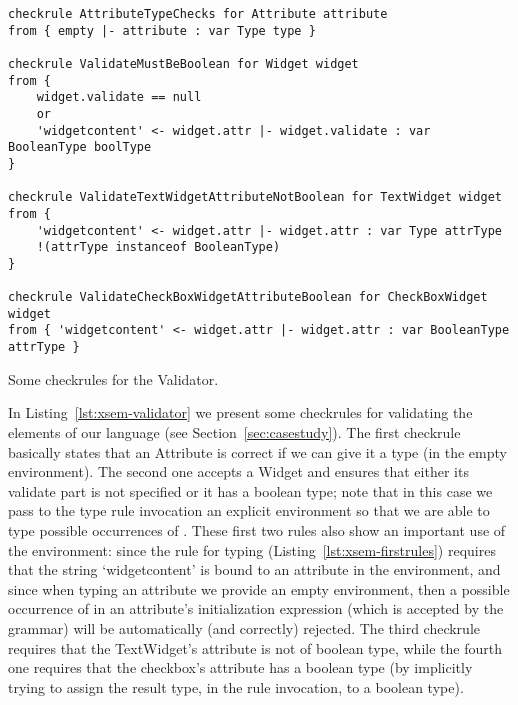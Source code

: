 \begin{listing}[tb]
\begin{lstlisting}[language=xsemantics] 
checkrule AttributeTypeChecks for Attribute attribute
from { empty |- attribute : var Type type }

checkrule ValidateMustBeBoolean for Widget widget
from {
	widget.validate == null
	or 
	'widgetcontent' <- widget.attr |- widget.validate : var BooleanType boolType
}

checkrule ValidateTextWidgetAttributeNotBoolean for TextWidget widget
from {
	'widgetcontent' <- widget.attr |- widget.attr : var Type attrType
	!(attrType instanceof BooleanType)
}

checkrule ValidateCheckBoxWidgetAttributeBoolean for CheckBoxWidget widget
from { 'widgetcontent' <- widget.attr |- widget.attr : var BooleanType attrType }
\end{lstlisting}
\caption{Some checkrules for the Validator.}
\label{lst:xsem-validator}
\end{listing}

In Listing~\ref{lst:xsem-validator} we present some checkrules for validating
the elements of our language (see Section~\ref{sec:casestudy}).  The first
checkrule basically states that an Attribute is correct if we can give it a type
(in the empty environment).  The second one accepts a Widget and ensures that
either its validate part is not specified or it has a boolean type; note that in
this case we pass to the type rule invocation an explicit environment so that we
are able to type possible occurrences of .  These first
two rules also show an important use of the environment: since the rule for
typing  (Listing~\ref{lst:xsem-firstrules}) requires that
the string `widgetcontent' is bound to an attribute in the environment, and
since when typing an attribute we provide an empty environment, then a possible
occurrence of  in an attribute's initialization expression
(which is accepted by the grammar) will be automatically (and correctly)
rejected.
The third checkrule requires that the TextWidget's attribute is not of boolean
type, while the fourth one requires that the checkbox's attribute has a boolean
type (by implicitly trying to assign the result type, in the rule invocation, to
a boolean type).
